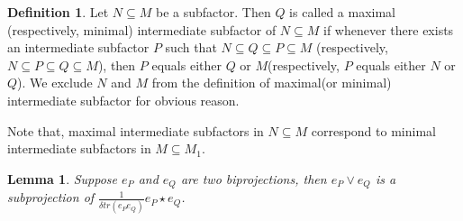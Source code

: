 \documentclass[11pt,letterpaper]{amsart}
\newtheorem{lemma}[theorem]{Lemma}
\theoremstyle{definition}
\newtheorem{definition}[theorem]{Definition}
\theoremstyle{remark}
\begin{document}
\begin{definition}
 Let $N\subseteq M$ be a subfactor. Then $Q$ is called a maximal (respectively, minimal) intermediate subfactor of $N\subseteq M$ if whenever there exists an intermediate subfactor $P$ such that $N\subseteq Q\subseteq P\subseteq M$ (respectively, $N\subseteq P\subseteq Q\subseteq M$), then
 $P$ equals either $Q$ or $M$(respectively, $P$ equals either $N$ or $Q$). We 
 exclude $N$ and $M$ from the definition of maximal(or minimal) intermediate subfactor for obvious reason. \par Note that, maximal intermediate subfactors in
$N\subseteq M$ correspond to minimal intermediate subfactors in $M\subseteq M_1$.
\end{definition}
\begin{lemma}\label{lem:epeq}
	Suppose $e_P$ and $e_Q$ are two biprojections, then $e_P\vee e_Q$ is a subprojection of $\frac{1}{\delta tr(e_Pe_Q)}e_P\star e_Q$.
\end{lemma}
\end{document}

